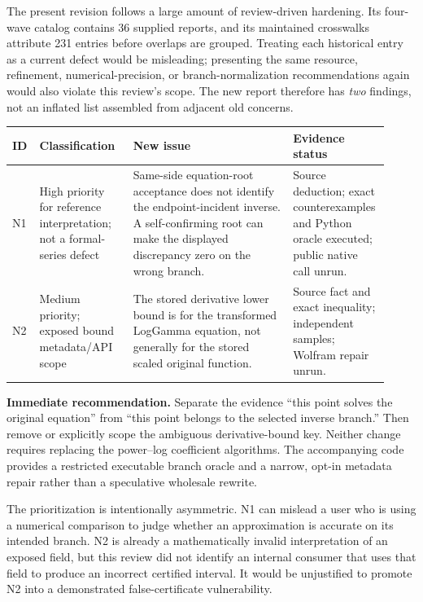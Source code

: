 \documentclass[11pt,letterpaper]{article}
\begin{document}
The present revision follows a large amount of review-driven hardening. Its four-wave catalog contains 36 supplied reports, and its maintained crosswalks attribute 231 entries before overlaps are grouped. Treating each historical entry as a current defect would be misleading; presenting the same resource, refinement, numerical-precision, or branch-normalization recommendations again would also violate this review's scope. The new report therefore has \emph{two} findings, not an inflated list assembled from adjacent old concerns.\cite{reviewindex,status,wave3,wave4}

\begin{longtable}{@{}P{0.07\linewidth}P{0.24\linewidth}P{0.41\linewidth}P{0.20\linewidth}@{}}
\toprule
ID & Classification & New issue & Evidence status\\\midrule\endhead
N1 & High priority for reference interpretation; not a formal-series defect & Same-side equation-root acceptance does not identify the endpoint-incident inverse. A self-confirming root can make the displayed discrepancy zero on the wrong branch. & Source deduction; exact counterexamples and Python oracle executed; public native call unrun.\\[6pt]
N2 & Medium priority; exposed bound metadata/API scope & The stored derivative lower bound is for the transformed LogGamma equation, not generally for the stored scaled original function. & Source fact and exact inequality; independent samples; Wolfram repair unrun.\\
\bottomrule
\end{longtable}

\textbf{Immediate recommendation.} Separate the evidence ``this point solves the original equation'' from ``this point belongs to the selected inverse branch.'' Then remove or explicitly scope the ambiguous derivative-bound key. Neither change requires replacing the power--log coefficient algorithms. The accompanying code provides a restricted executable branch oracle and a narrow, opt-in metadata repair rather than a speculative wholesale rewrite.

The prioritization is intentionally asymmetric. N1 can mislead a user who is using a numerical comparison to judge whether an approximation is accurate on its intended branch. N2 is already a mathematically invalid interpretation of an exposed field, but this review did not identify an internal consumer that uses that field to produce an incorrect certified interval. It would be unjustified to promote N2 into a demonstrated false-certificate vulnerability.
\end{document}
